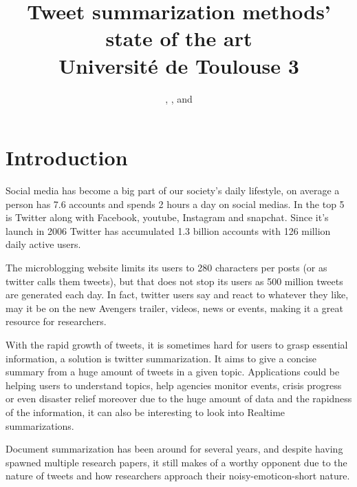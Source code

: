 \documentclass[a4paper, twocolumn]{article}
\begin{document}

\title{Tweet summarization methods' state of the art \\
    \large Université de Toulouse 3}
\author{
    ,
    ,
     and
    }
\date{}

\maketitle

\begin{abstract}

\end{abstract}

\section{Introduction}

Social media has become a big part of our society's daily lifestyle, on average
a person has 7.6 accounts and spends 2 hours a day on social medias. In the top
5 is Twitter along with Facebook, youtube, Instagram and snapchat. Since it’s
launch in 2006 Twitter has accumulated 1.3 billion accounts with 126 million
daily active users.

The microblogging website limits its users to 280 characters per posts (or as
twitter calls them tweets), but that does not stop its users as 500 million
tweets are generated each day. In fact, twitter users say and react to whatever
they like, may it be on the new Avengers trailer, videos, news or events,
making it a great resource for researchers.

With the rapid growth of tweets, it is sometimes hard for users to grasp
essential information, a solution is twitter summarization. It aims to give a
concise summary from a huge amount of tweets in a given topic. Applications
could be helping users to understand topics, help agencies monitor events,
crisis progress or even disaster relief moreover due to the huge amount of data
and the rapidness of the information, it can also be interesting to look into
Realtime summarizations.

Document summarization has been around for several years, and despite having
spawned multiple research papers, it still makes of a worthy opponent due to
the nature of tweets and how researchers approach their noisy-emoticon-short
nature.
\end{document}
